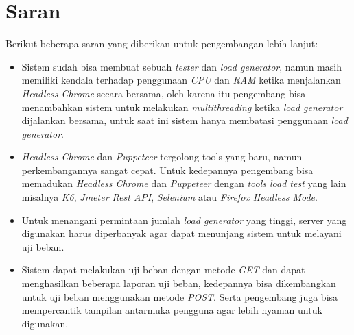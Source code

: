 	\section{Saran}
		Berikut beberapa saran yang diberikan untuk pengembangan lebih lanjut:
		\begin{itemize}
			\item Sistem sudah bisa membuat sebuah \textit{tester} dan \textit{load generator}, namun masih memiliki kendala terhadap penggunaan \textit{CPU} dan \textit{RAM} ketika menjalankan \textit{Headless Chrome} secara bersama, oleh karena itu pengembang bisa menambahkan sistem untuk melakukan \textit{multithreading} ketika \textit{load generator} dijalankan bersama, untuk saat ini sistem hanya membatasi penggunaan \textit{load generator}.
			\item \textit{Headless Chrome} dan \textit{Puppeteer} tergolong tools yang baru, namun perkembangannya sangat cepat. Untuk kedepannya pengembang bisa memadukan \textit{Headless Chrome} dan \textit{Puppeteer} dengan \textit{tools load test} yang lain misalnya \textit{K6}, \textit{Jmeter Rest API}, \textit{Selenium} atau \textit{Firefox Headless Mode}.
			\item Untuk menangani permintaan jumlah \textit{load generator} yang tinggi, server yang digunakan harus diperbanyak agar dapat menunjang sistem untuk melayani uji beban.
			\item Sistem dapat melakukan uji beban dengan metode \textit{GET} dan dapat menghasilkan beberapa laporan uji beban, kedepannya bisa dikembangkan untuk uji beban menggunakan metode \textit{POST}. Serta pengembang juga bisa mempercantik tampilan antarmuka pengguna agar lebih nyaman untuk digunakan.
		\end{itemize}